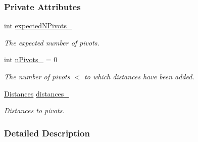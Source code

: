 \subsubsection*{Private Attributes}
\begin{DoxyCompactItemize}
\item 
int \hyperlink{structslb_1_1ext_1_1heuristic_1_1differential_1_1DistancesToPivots_a57e0ac0329ae9755dc23d917e14c090a}{expected\+N\+Pivots\+\_\+}\hypertarget{structslb_1_1ext_1_1heuristic_1_1differential_1_1DistancesToPivots_a57e0ac0329ae9755dc23d917e14c090a}{}\label{structslb_1_1ext_1_1heuristic_1_1differential_1_1DistancesToPivots_a57e0ac0329ae9755dc23d917e14c090a}

\begin{DoxyCompactList}\small\item\em The expected number of pivots. \end{DoxyCompactList}\item 
int \hyperlink{structslb_1_1ext_1_1heuristic_1_1differential_1_1DistancesToPivots_a7f7561b20fd174fb2436c3ce1744913e}{n\+Pivots\+\_\+} = 0\hypertarget{structslb_1_1ext_1_1heuristic_1_1differential_1_1DistancesToPivots_a7f7561b20fd174fb2436c3ce1744913e}{}\label{structslb_1_1ext_1_1heuristic_1_1differential_1_1DistancesToPivots_a7f7561b20fd174fb2436c3ce1744913e}

\begin{DoxyCompactList}\small\item\em The number of pivots $<$ to which distances have been added. \end{DoxyCompactList}\item 
\hyperlink{structslb_1_1ext_1_1heuristic_1_1differential_1_1DistancesToPivots_af1bead3d0ade455bbe8901d3adfbd62b}{Distances} \hyperlink{structslb_1_1ext_1_1heuristic_1_1differential_1_1DistancesToPivots_acd953ab649dda7ede08611cda2e2ce62}{distances\+\_\+}\hypertarget{structslb_1_1ext_1_1heuristic_1_1differential_1_1DistancesToPivots_acd953ab649dda7ede08611cda2e2ce62}{}\label{structslb_1_1ext_1_1heuristic_1_1differential_1_1DistancesToPivots_acd953ab649dda7ede08611cda2e2ce62}

\begin{DoxyCompactList}\small\item\em Distances to pivots. \end{DoxyCompactList}\end{DoxyCompactItemize}


\subsubsection{Detailed Description}
